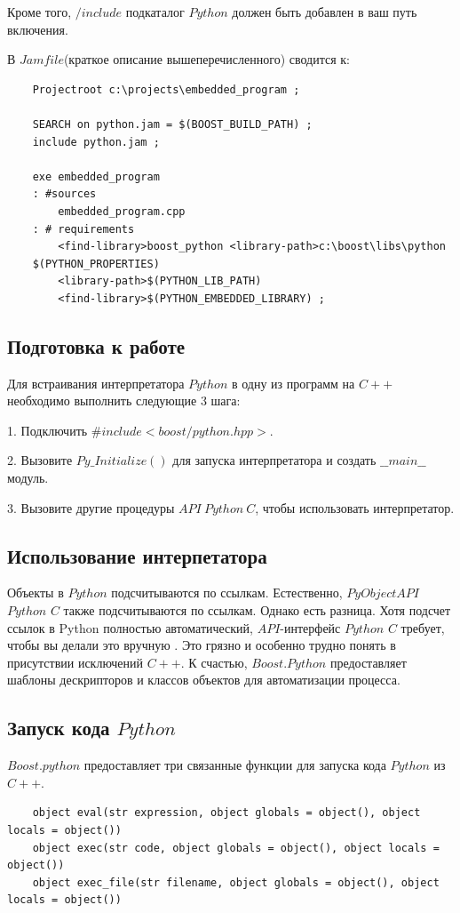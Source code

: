 \documentclass[a4paper, 14pt]{extarticle}
\makeatletter
\newcommand{\verbatimfont}[1]{\renewcommand{\verbatim@font}{\ttfamily#1}}
\makeatother
\begin{document}
Кроме того, $/include$ подкаталог $Python$ должен быть добавлен в ваш путь включения.

В $Jamfile$(краткое описание вышеперечисленного) сводится к:
\begin{verbatim}
    Projectroot c:\projects\embedded_program ;

    SEARCH on python.jam = $(BOOST_BUILD_PATH) ;
    include python.jam ;

    exe embedded_program
    : #sources
        embedded_program.cpp
    : # requirements
        <find-library>boost_python <library-path>c:\boost\libs\python
    $(PYTHON_PROPERTIES)
        <library-path>$(PYTHON_LIB_PATH)
        <find-library>$(PYTHON_EMBEDDED_LIBRARY) ;
\end{verbatim}

\subsection{Подготовка к работе}
Для встраивания интерпретатора $Python$ в одну из программ на $C++$ необходимо выполнить следующие 3 шага:

1. Подключить $\#include <boost/python.hpp>$.

2. Вызовите $Py\_Initialize()$ для запуска интерпретатора и создать $\_\_main\_\_$  модуль.

3. Вызовите другие процедуры $API\ Python\ C$, чтобы использовать интерпретатор.

\subsection{Использование интерпетатора}
Объекты в $Python$ подсчитываются по ссылкам. Естественно, $PyObjectAPI$ $Python$ $C$ также подсчитываются по ссылкам. Однако есть разница. Хотя подсчет ссылок в Python полностью автоматический, $API$-интерфейс $Python$ $C$ требует, чтобы вы делали это вручную . Это грязно и особенно трудно понять в присутствии исключений $C++$. К счастью, $Boost.Python$ предоставляет шаблоны дескрипторов и классов объектов для автоматизации процесса.

\subsection{Запуск кода $Python$}
$Boost.python$ предоставляет три связанные функции для запуска кода $Python$ из $C++$.
\verbatimfont{\small}
\begin{verbatim}
    object eval(str expression, object globals = object(), object locals = object())
    object exec(str code, object globals = object(), object locals = object())
    object exec_file(str filename, object globals = object(), object locals = object())
\end{verbatim}
\end{document}
